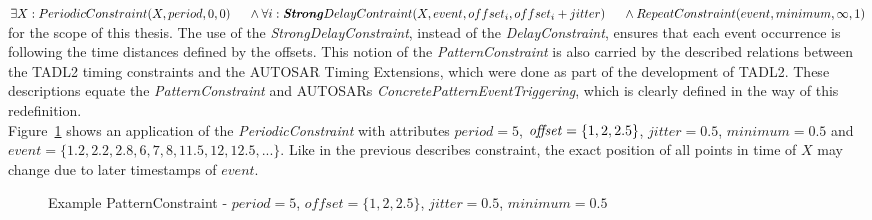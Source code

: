 		\begin{math}
			\exists X: PeriodicConstraint(X, period, 0, 0)\\
			\text{\hspace{.5cm}} \land \forall i: \textbf{\emph{Strong}}DelayContraint(X, event, offset_i, offset_i+jitter)\\
			\text{\hspace{.5cm}} \land RepeatConstraint(event, minimum, \infty, 1)
		\end{math}\\[10pt]
		for the scope of this thesis. The use of the \emph{StrongDelayConstraint}, instead of the \emph{DelayConstraint}, ensures that each event occurrence is following the time distances defined by the offsets. This notion of the \emph{PatternConstraint} is also carried by the described relations between the TADL2 timing constraints and the AUTOSAR Timing Extensions, which were done as part of the development of TADL2\cite{TIMMO2USE}. These descriptions equate the \emph{PatternConstraint} and AUTOSARs \emph{ConcretePatternEventTriggering}, which is clearly defined in the way of this redefinition.\\
		Figure~\ref{fig:PatternConstraintExample} shows an application of the \emph{PeriodicConstraint} with attributes $period=5$, $\text{\textit{offset}}=\{1, 2, 2.5\}$, $jitter=0.5$, $minimum=0.5$ and\\
		$event = \{1.2, 2.2, 2.8, 6, 7, 8, 11.5, 12, 12.5, ...\}$. Like in the previous describes constraint, the exact position of all points in time of $X$ may change due to later timestamps of $event$.
		\begin{figure}
			\caption{Example PatternConstraint - $period=5$, $offset=\{1, 2, 2.5\}$, $jitter=0.5$, $minimum=0.5$}
			\label{fig:PatternConstraintExample}
		\end{figure}
		

